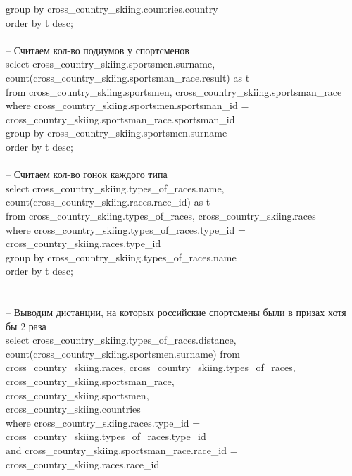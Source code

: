 \documentclass[a4paper,12pt]{article}
\begin{document}
\indent group by cross\_country\_skiing.countries.country\\
\indent order by t desc;\\
\\
-- Считаем кол-во подиумов у спортсменов\\
select cross\_country\_skiing.sportsmen.surname,\\ \indent count(cross\_country\_skiing.sportsman\_race.result) as t\\
\indent from cross\_country\_skiing.sportsmen, cross\_country\_skiing.sportsman\_race\\
\indent where cross\_country\_skiing.sportsmen.sportsman\_id = cross\_country\_skiing.sportsman\_race.sportsman\_id\\
\indent group by cross\_country\_skiing.sportsmen.surname\\
\indent order by t desc;\\
\\
-- Считаем кол-во гонок каждого типа\\
select cross\_country\_skiing.types\_of\_races.name,\\ \indent count(cross\_country\_skiing.races.race\_id) as t\\
\indent from cross\_country\_skiing.types\_of\_races, cross\_country\_skiing.races\\
\indent where cross\_country\_skiing.types\_of\_races.type\_id = cross\_country\_skiing.races.type\_id\\
\indent group by cross\_country\_skiing.types\_of\_races.name\\
\indent order by t desc;\\
\\
\\
-- Выводим дистанции, на которых российские спортсмены были в призах хотя бы 2 раза\\
select cross\_country\_skiing.types\_of\_races.distance, count(cross\_country\_skiing.sportsmen.surname)
\indent from cross\_country\_skiing.races, cross\_country\_skiing.types\_of\_races, cross\_country\_skiing.sportsman\_race, \\ \indent cross\_country\_skiing.sportsmen, \\
\indent cross\_country\_skiing.countries \\
\indent where cross\_country\_skiing.races.type\_id = cross\_country\_skiing.types\_of\_races.type\_id \\
\indent \indent and cross\_country\_skiing.sportsman\_race.race\_id = cross\_country\_skiing.races.race\_id \\
\end{document}
